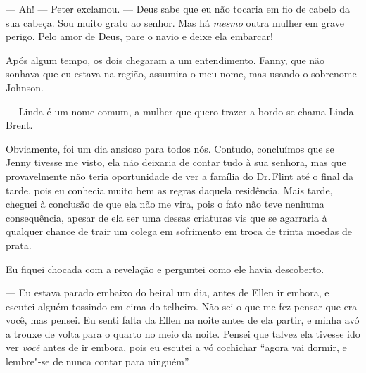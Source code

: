 --- Ah! --- Peter exclamou. --- Deus
sabe que eu não tocaria em fio de cabelo da sua cabeça. Sou muito grato
ao senhor. Mas há \emph{mesmo} outra mulher em grave perigo. Pelo amor
de Deus, pare o navio e deixe ela embarcar!

Após algum tempo, os dois chegaram a um
entendimento. Fanny, que não sonhava que eu estava na região, assumira o
meu nome, mas usando o sobrenome Johnson.

--- Linda é um nome comum, a mulher que quero trazer a bordo se chama
Linda Brent.


Obviamente, foi um dia ansioso para
todos nós. Contudo, concluímos que se Jenny tivesse me visto, ela não
deixaria de contar tudo à sua senhora, mas que provavelmente não teria
oportunidade de ver a família do Dr.\,Flint até o final da tarde, pois eu
conhecia muito bem as regras daquela residência. Mais tarde, cheguei à
conclusão de que ela não me vira, pois o fato não teve nenhuma
consequência, apesar de ela ser uma dessas criaturas vis que se
agarraria à qualquer chance de trair um colega em sofrimento em troca de
trinta moedas de prata.



Eu fiquei chocada com a revelação e perguntei como ele havia descoberto.

--- Eu estava parado embaixo do beiral
um dia, antes de Ellen ir embora, e escutei alguém tossindo em cima do
telheiro. Não sei o que me fez pensar que era você, mas pensei. Eu senti
falta da Ellen na noite antes de ela partir, e minha avó a trouxe de
volta para o quarto no meio da noite. Pensei que talvez ela tivesse ido
ver \emph{você} antes de ir embora, pois eu escutei a vó cochichar
``agora vai dormir, e lembre"-se de nunca contar para ninguém''.

